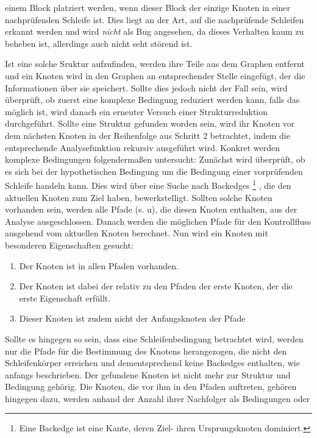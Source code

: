 \documentclass[11pt]{article}
\begin{document}
\begin{enumerate}
\begin{enumerate}
{					einem Block platziert werden, wenn dieser Block der einzige
					Knoten in einer nachprüfenden Schleife ist.
					Dies liegt an der Art, auf die nachprüfende Schleifen
					erkannt werden und wird \textit{nicht} als Bug angesehen,
					da dieses Verhalten kaum zu beheben ist, allerdings auch
					nicht seht störend ist.
				}
		\end{enumerate}
		Ist eine solche Sruktur aufzufinden, werden ihre Teile aus dem Graphen entfernt und ein
		Knoten wird in den Graphen an entsprechender Stelle eingefügt, der
		die Informationen über sie speichert. Sollte dies jedoch nicht der Fall
		sein, wird überprüft, ob zuerst eine komplexe Bedingung reduziert
		werden kann, falls das möglich ist, wird danach ein erneuter Versuch einer
		Strukturreduktion durchgeführt. Sollte eine Struktur gefunden worden
		sein, wird ihr Knoten vor dem nächsten Knoten in der Reihenfolge aus
		Schritt 2 betrachtet, indem die entsprechende Analysefunktion rekursiv
		ausgeführt wird. Konkret werden komplexe Bedingungen
		folgendermaßen untersucht: Zunächst wird überprüft, ob es sich bei
		der hypothetischen Bedingung um die Bedingung einer vorprüfenden
		Schleife handeln kann. Dies wird über eine Suche nach Backedges
		\footnote{
			Eine Backedge ist eine Kante, deren Ziel- ihren Ursprungsknoten dominiert.
		}
		, die den
		aktuellen Knoten zum Ziel haben, bewerkstelligt. Sollten solche Knoten
		vorhanden sein, werden alle Pfade (s. u), die diesen Knoten enthalten,
		aus der Analyse ausgeschlossen. Danach werden die möglichen Pfade für den
		Kontrollfluss ausgehend vom aktuellen Knoten berechnet.  Nun wird ein Knoten mit
		besonderen Eigenschaften gesucht:
		\begin{enumerate}
			\item{Der Knoten ist in allen Pfaden vorhanden.}
			\item{
				Der Knoten ist dabei der relativ zu den Pfaden
				der erste Knoten, der die erste Eigenschaft erfüllt.}
			\item{Dieser Knoten ist zudem nicht der Anfangsknoten der Pfade}
		\end{enumerate}
		Sollte es hingegen so sein, dass eine
		Schleifenbedingung betrachtet wird, werden nur die Pfade für die
		Bestimmung des Knotens herangezogen, die nicht den Schleifenkörper
		erreichen und dementsprechend keine Backedges enthalten, wie anfangs beschrieben.
		Der gefundene Knoten ist nicht mehr zur Struktur und Bedingung gehörig.
		Die Knoten, die vor ihm in den Pfaden auftreten, gehören hingegen
		dazu, werden anhand der Anzahl ihrer Nachfolger als Bedingungen oder 

\end{enumerate}
\end{document}
